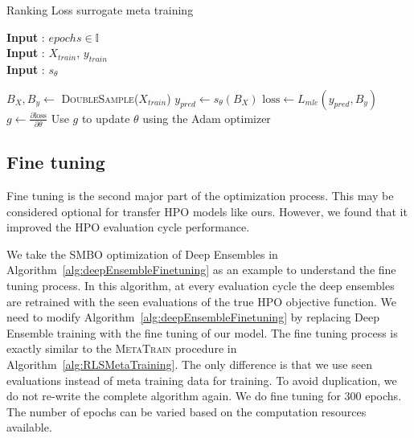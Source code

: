 \documentclass[12pt, twoside, ngerman]{report}
\begin{document}
\begin{algorithm}[h]
\caption{Ranking Loss surrogate meta training}
\label{alg:RLSMetaTraining}
\hspace*{\algorithmicindent} \textbf{Input} : $epochs \in \mathbb{I}$ \\
 \hspace*{\algorithmicindent} \textbf{Input} : $X_{train}$,  $y_{train}$   \\
\hspace*{\algorithmicindent} \textbf{Input} : $s_{\theta}$ 
\begin{algorithmic}[1]
                \State $B_{X}, B_{y} \gets$ \textsc{DoubleSample}($X_{train}$) 
                \State $y_{pred} \gets s_{\theta}(B_{X})$
                \State $\textrm{loss} \gets L_{mle}(y_{pred},  B_{y}) $
                \State $g \gets \frac{\partial \textrm{loss}}{\partial \theta}$ 
                \State Use $g$ to update $\theta$ using the Adam optimizer
            \EndFor
    \EndFor
\EndProcedure
\end{algorithmic}
\end{algorithm}



\subsection{Fine tuning}\label{sec:rlfinetune}
Fine tuning is the second major part of the optimization process.
This may be considered optional for transfer HPO models like ours.
However,  we found that it improved the HPO evaluation cycle performance.

We take the SMBO optimization of Deep Ensembles in Algorithm~\ref{alg:deepEnsembleFinetuning} as an example to understand the fine tuning process.
In this algorithm,  at every evaluation cycle the deep ensembles are retrained with the seen evaluations of the true HPO objective function.
We need to modify Algorithm~\ref{alg:deepEnsembleFinetuning} by replacing Deep Ensemble training with the fine tuning of our model.
The fine tuning  process is exactly similar to the \textsc{MetaTrain} procedure in Algorithm~\ref{alg:RLSMetaTraining}.
The only difference is that we use seen evaluations instead of meta training data for training.
To avoid duplication,  we do not re-write the complete algorithm again.
We do fine tuning for 300 epochs.
The number of epochs can be varied based on the computation resources available.
\end{document}
